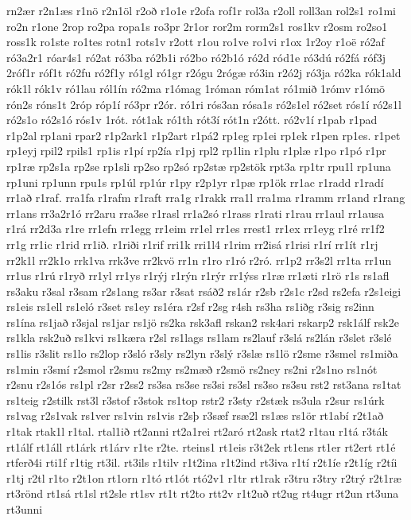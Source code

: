 {rn2ær
r2n1æs
r1nö
r2n1öl
r2oð
r1o1e
r2ofa
rof1r
rol3a
r2oll
roll3an
rol2s1
ro1mi
ro2n
r1one
2rop
ro2pa
ropa1s
ro3pr
2r1or
ror2m
rorm2s1
ros1kv
r2osm
ro2so1
ross1k
ro1ste
ro1tes
rotn1
rots1v
r2ott
r1ou
ro1ve
ro1vi
r1ox
1r2oy
r1oë
ró2af
ró3a2r1
róar4s1
ró2at
ró3ba
ró2b1i
ró2bo
ró2b1ó
ró2d
ród1e
ró3dú
ró2fá
róf3j
2róf1r
róf1t
ró2fu
ró2f1y
ró1gl
ró1gr
r2ógu
2rógæ
ró3in
r2ó2j
ró3ja
ró2ka
rók1ald
rók1l
rók1v
ró1lau
ról1ín
ró2ma
r1ómag
1róman
róm1at
ró1mið
1rómv
r1ómö
rón2s
róns1t
2róp
róp1í
ró3pr
r2ór.
ró1ri
rós3an
rósa1s
ró2s1el
ró2set
rós1í
ró2s1l
ró2s1o
ró2s1ó
rós1v
1rót.
rót1ak
ró1th
rót3í
rót1n
r2ótt.
ró2v1í
r1pab
r1pad
r1p2al
rp1ani
rpar2
r1p2ark1
r1p2art
r1pá2
rp1eg
rp1ei
rp1ek
r1pen
rp1es.
r1pet
rp1eyj
rpil2
rpils1
rp1is
r1pí
rp2ía
r1pj
rpl2
rp1lin
r1plu
r1plæ
r1po
r1pó
r1pr
rp1ræ
rp2s1a
rp2se
rp1sli
rp2so
rp2só
rp2stæ
rp2stök
rpt3a
rp1tr
rpu1l
rp1una
rp1uni
rp1unn
rpu1s
rp1úl
rp1úr
r1py
r2p1yr
r1pæ
rp1ök
rr1ac
r1radd
r1radí
rr1að
r1raf.
rra1fa
r1rafm
r1raft
rra1g
r1rakk
rra1l
rra1ma
r1ramm
rr1and
r1rang
rr1ans
rr3a2r1ó
rr2aru
rra3se
r1rasl
rr1a2só
r1rass
r1rati
r1rau
rr1aul
rr1ausa
r1rá
rr2d3a
r1re
rr1efn
rr1egg
rr1eim
rr1el
rr1es
rrest1
rr1ex
rr1eyg
r1ré
rr1f2
rr1g
rr1ic
r1rid
rr1ið.
r1riði
r1rif
rri1k
rri1l4
r1rim
rr2isá
r1risi
r1rí
rr1ít
r1rj
rr2k1l
rr2k1o
rrk1va
rrk3ve
rr2kvö
rr1n
r1ro
r1ró
r2ró.
rr1p2
rr3s2l
rr1ta
rr1un
rr1us
r1rú
r1ryð
rr1yl
rr1ys
r1rýj
r1rýn
r1rýr
rr1ýss
r1ræ
rr1æti
r1rö
r1s
rs1afl
rs3aku
r3sal
r3sam
r2s1ang
rs3ar
r3sat
rsáð2
rs1ár
r2sb
r2s1c
r2sd
rs2efa
r2s1eigi
rs1eis
rs1ell
rs1eló
r3set
rs1ey
rs1éra
r2sf
r2sg
r4sh
rs3ha
rs1iðg
r3sig
rs2inn
rs1ína
rs1jað
r3sjal
rs1jar
rs1jö
rs2ka
rsk3afl
rskan2
rsk4ari
rskarp2
rsk1álf
rsk2e
rs1kla
rsk2uð
rs1kvi
rs1kæra
r2sl
rs1lags
rs1lam
rs2lauf
r3slá
rs2lán
r3slet
r3slé
rs1lis
r3slit
rs1lo
rs2lop
r3sló
r3sly
rs2lyn
r3slý
r3slæ
rs1lö
r2sme
r3smel
rs1miða
rs1min
r3smí
r2smol
r2smu
rs2my
rs2mæð
r2smö
rs2ney
rs2ni
r2s1no
rs1nót
r2snu
r2s1ós
rs1pl
r2sr
r2ss2
rs3sa
rs3se
rs3si
rs3sl
rs3so
rs3su
rst2
rst3ana
rs1tat
rs1teig
r2stilk
rst3l
r3stof
r3stok
rs1top
rstr2
r3sty
r2stæk
rs3ula
r2sur
rs1úrk
rs1vag
r2s1vak
rs1ver
rs1vin
rs1vis
r2sþ
r3sæf
rsæ2l
rs1æs
rs1ör
rt1abí
r2t1að
r1tak
rtak1l
r1tal.
rtal1ið
rt2anni
rt2a1rei
rt2aró
rt2ask
rtat2
r1tau
r1tá
r3ták
rt1álf
rt1áll
rt1árk
rt1árv
r1te
r2te.
rteins1
rt1eis
r3t2ek
rt1ens
rt1er
rt2ert
rt1é
rtferð4i
rti1f
r1tig
rt3il.
rt3ils
r1tilv
r1t2ina
r1t2ind
rt3iva
r1tí
r2t1íe
r2t1íg
r2tíi
r1tj
r2tl
r1to
r2t1on
rt1orn
r1tó
rt1ót
rtó2v1
r1tr
rt1rak
r3tru
r3try
r2trý
r2t1ræ
rt3rönd
rt1sá
rt1sl
rt2sle
rt1sv
rt1t
rt2to
rtt2v
r1t2uð
rt2ug
rt4ugr
rt2un
rt3una
rt3unni
}
